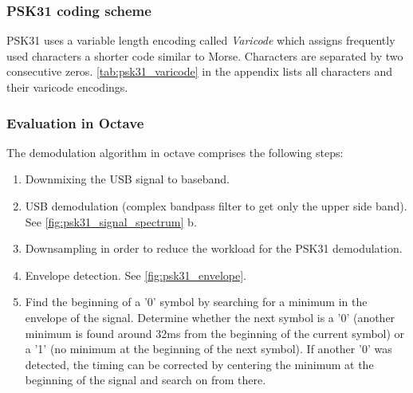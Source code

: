 \subsubsection{PSK31 coding scheme}

\ac{PSK31} uses a variable length encoding called \emph{Varicode} which assigns
frequently used characters a shorter code similar to Morse. Characters are separated
by two consecutive zeros. \autoref{tab:psk31_varicode} in the appendix lists all
characters and their varicode encodings.

\subsubsection{Evaluation in Octave}

The demodulation algorithm in octave comprises the following steps:
\begin{enumerate}
	\item Downmixing the \ac{USB} signal to baseband.
	\item \ac{USB} demodulation (complex bandpass filter to
		get only the upper side band). See \autoref{fig:psk31_signal_spectrum} b.
	\item Downsampling in order to reduce the workload for the PSK31 demodulation.
	\item Envelope detection. See \autoref{fig:psk31_envelope}.
	\item Find the beginning of a '0' symbol by searching for a minimum in the
		envelope of the signal. Determine whether the next symbol is a '0' (another
		minimum is found around 32ms from the beginning of the current symbol) or
		a '1' (no minimum at the beginning of the next symbol). If another '0' was
		detected, the timing can be corrected by centering the minimum at the beginning
		of the signal and search on from there.
\end{enumerate}

